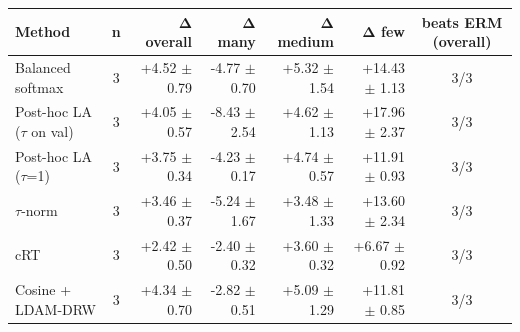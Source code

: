 \begin{tabular}{lcrrrrc}
\toprule
Method & n & Δ overall & Δ many & Δ medium & Δ few & beats ERM (overall) \\
\midrule
Balanced softmax & 3 & +4.52 $\pm$ 0.79 & -4.77 $\pm$ 0.70 & +5.32 $\pm$ 1.54 & +14.43 $\pm$ 1.13 & 3/3 \\
Post-hoc LA ($\tau$ on val) & 3 & +4.05 $\pm$ 0.57 & -8.43 $\pm$ 2.54 & +4.62 $\pm$ 1.13 & +17.96 $\pm$ 2.37 & 3/3 \\
Post-hoc LA ($\tau$=1) & 3 & +3.75 $\pm$ 0.34 & -4.23 $\pm$ 0.17 & +4.74 $\pm$ 0.57 & +11.91 $\pm$ 0.93 & 3/3 \\
$\tau$-norm & 3 & +3.46 $\pm$ 0.37 & -5.24 $\pm$ 1.67 & +3.48 $\pm$ 1.33 & +13.60 $\pm$ 2.34 & 3/3 \\
cRT & 3 & +2.42 $\pm$ 0.50 & -2.40 $\pm$ 0.32 & +3.60 $\pm$ 0.32 & +6.67 $\pm$ 0.92 & 3/3 \\
Cosine + LDAM-DRW & 3 & +4.34 $\pm$ 0.70 & -2.82 $\pm$ 0.51 & +5.09 $\pm$ 1.29 & +11.81 $\pm$ 0.85 & 3/3 \\
\bottomrule
\end{tabular}